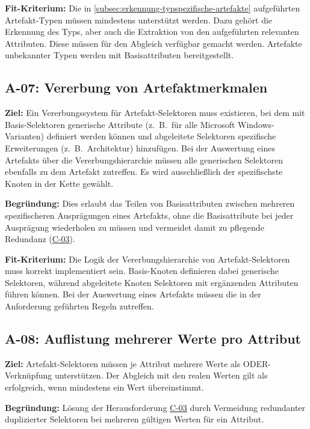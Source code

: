 \textbf{Fit-Kriterium:}
Die in \autoref{subsec:erkennung-typspezifische-artefakte} aufgeführten Artefakt-Typen müssen mindestens unterstützt werden.
Dazu gehört die Erkennung des Typs, aber auch die Extraktion von den aufgeführten relevanten Attributen.
Diese müssen für den Abgleich verfügbar gemacht werden.
Artefakte unbekannter Typen werden mit Basisattributen bereitgestellt.

\subsection{A-07: Vererbung von Artefaktmerkmalen}\label{subsec:req-selektor-inheritance}

\textbf{Ziel:}
Ein Vererbungssystem für Artefakt-Selektoren muss existieren, bei dem mit Basis-Selektoren generische Attribute (z.\ B.\ für alle Microsoft Windows-Varianten) definiert werden können und abgeleitete Selektoren spezifische Erweiterungen (z.\ B.\ Architektur) hinzufügen.
Bei der Auswertung eines Artefakts über die Vererbungshierarchie müssen alle generischen Selektoren ebenfalls zu dem Artefakt zutreffen.
Es wird ausschließlich der spezifischste Knoten in der Kette gewählt.

\textbf{Begründung:}
Dies erlaubt das Teilen von Basisattributen zwischen mehreren spezifischeren Ausprägungen eines Artefakts, ohne die Basisattribute bei jeder Ausprägung wiederholen zu müssen und vermeidet damit zu pflegende Redundanz (\hyperref[subsec:c-03-duplizierte-artefakt-selektoren]{C-03}).

\textbf{Fit-Kriterium:}
Die Logik der Vererbungshierarchie von Artefakt-Selektoren muss korrekt implementiert sein.
Basis-Knoten definieren dabei generische Selektoren, während abgeleitete Knoten Selektoren mit ergänzenden Attributen führen können.
Bei der Auswertung eines Artefakts müssen die in der Anforderung geführten Regeln zutreffen.

\subsection{A-08: Auflistung mehrerer Werte pro Attribut}\label{subsec:req-multiple-attribute-values}

\textbf{Ziel:}
Artefakt-Selektoren müssen je Attribut mehrere Werte als ODER-Verknüpfung unterstützen.
Der Abgleich mit den realen Werten gilt als erfolgreich, wenn mindestens ein Wert übereinstimmt.

\textbf{Begründung:}
Lösung der Herausforderung \hyperref[subsec:c-03-duplizierte-artefakt-selektoren]{C-03} durch Vermeidung redundanter duplizierter Selektoren bei mehreren gültigen Werten für ein Attribut.

